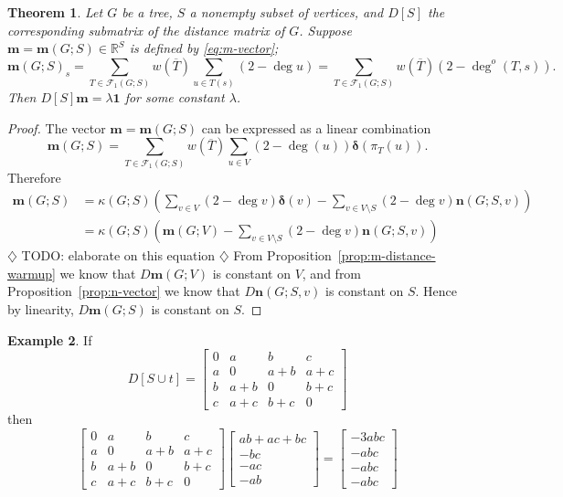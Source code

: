 \documentclass{amsart}
\newtheorem{thm}{Theorem}
\theoremstyle{definition}
\newtheorem{eg}[thm]{Example}
\newcommand{\RR}{\mathbb{R}}
\newcommand{\bone}{\mathbf{1}}
\newcommand{\bolddelta}{\bm{\delta}}
\newcommand{\boldm}{\mathbf{m}}
\newcommand{\boldn}{\mathbf{n}}
\newcommand{\trees}{\mathcal{F}_1}
\newcommand{\degout}{\deg^o}
\newcommand{\note}[1]{{\color{red} \sf $\diamondsuit$  {#1} $\diamondsuit$ }}
\begin{document}
\begin{thm}
Let $G$ be a tree, $S$ a nonempty subset of vertices,
and $D[S]$ the corresponding submatrix of the distance matrix of $G$.
Suppose $\boldm = \boldm(G;S) \in \RR^{S}$ is defined by \eqref{eq:m-vector};
\begin{equation}
	\boldm(G;S)_s = \sum_{T \in \trees(G;S)} w(\overline{T}) \sum_{u \in T(s)} (2 - \deg u) 
	= \sum_{T \in \trees(G;S)} w(\overline{T}) (2 - \degout(T,s)) .
\end{equation}
Then $D[S] \boldm = \lambda \bone$
for some constant $\lambda$.
\end{thm}
\begin{proof}
The vector $\boldm = \boldm(G;S)$ can be expressed as a linear combination
\[
	\boldm(G; S) = \sum_{T \in \trees(G; S)} w(\overline{T}) \sum_{u \in V} (2 - \deg(u)) \bolddelta(\pi_T(u)).
\]
Therefore
\begin{align}
	\boldm (G;S)
	&= \kappa(G;S) \left( \sum_{v \in V}(2 - \deg v) {\bolddelta}(v) 
	- \sum_{v \in V \setminus S} (2 - \deg v) \mathbf{n}(G;S,v) 
	\right) \\
	&= \kappa(G;S) \left( \boldm(G;V) - \sum_{v\in V\setminus S} (2 - \deg v) \boldn(G;S,v) \right)
\end{align}
\note{TODO: elaborate on this equation}
From Proposition~\ref{prop:m-distance-warmup} we know that $D \boldm(G;V)$ is constant on $V$,
and from Proposition~\ref{prop:n-vector} we know that $D \boldn(G;S,v)$ is constant on $S$.
Hence by linearity, $D \boldm(G;S)$ is constant on $S$.
\end{proof}

\begin{eg}
If 
$$
D[S \cup t] = \begin{bmatrix}
0 & a & b & c \\
a & 0 & a + b & a + c \\
b & a + b & 0 & b + c \\
c & a + c & b + c & 0
\end{bmatrix}
$$
then
$$
 \begin{bmatrix}
0 & a & b & c \\
a & 0 & a + b & a + c \\
b & a + b & 0 & b + c \\
c & a + c & b + c & 0
\end{bmatrix}
\begin{bmatrix}
ab + ac + bc \\ -bc \\ -ac \\ -ab 
\end{bmatrix}
= \begin{bmatrix}
-3abc \\ -abc \\ -abc \\ -abc
\end{bmatrix}
$$
\end{eg}
\end{document}
